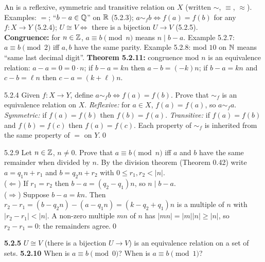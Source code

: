 
\begin{key}
An  is a reflexive, symmetric and transitive relation on $X$ (written $\sim$, $\equiv$, $\approx$). Examples: $=$; ``$b-a\in\mathbb{Q}$'' on $\mathbb{R}$ (5.2.3); $a\sim_fb\Leftrightarrow f(a)=f(b)$ for any $f:X\to Y$ (5.2.4); $U\cong V\Leftrightarrow$ there is a bijection $U\to V$ (5.2.5).\\
\textbf{Congruence:} for $n\in\mathbb{Z}$, $a\equiv b\pmod n$ means $n\mid b-a$. Example 5.2.7: $a\equiv b\pmod2$ iff $a,b$ have the same parity. Example 5.2.8: mod $10$ on $\mathbb{N}$ means ``same last decimal digit''. \textbf{Theorem 5.2.11:} congruence mod $n$ is an equivalence relation: $a-a=0=0\cdot n$; if $b-a=kn$ then $a-b=(-k)n$; if $b-a=kn$ and $c-b=\ell n$ then $c-a=(k+\ell)n$.
\end{key}

\begin{bookex}{5.2.4}
Given $f:X\to Y$, define $a\sim_fb\Leftrightarrow f(a)=f(b)$. Prove that $\sim_f$ is an equivalence relation on $X$.
\solution
\emph{Reflexive:} for $a\in X$, $f(a)=f(a)$, so $a\sim_fa$. \emph{Symmetric:} if $f(a)=f(b)$ then $f(b)=f(a)$. \emph{Transitive:} if $f(a)=f(b)$ and $f(b)=f(c)$ then $f(a)=f(c)$. Each property of $\sim_f$ is inherited from the same property of $=$ on $Y$.\qed
\end{bookex}

\begin{bookex}{5.2.9}
Let $n\in\mathbb{Z}$, $n\ne0$. Prove that $a\equiv b\pmod n$ iff $a$ and $b$ have the same remainder when divided by $n$.
\solution
By the division theorem (Theorem 0.42) write $a=q_1n+r_1$ and $b=q_2n+r_2$ with $0\le r_1,r_2<|n|$.\\
($\Leftarrow$) If $r_1=r_2$ then $b-a=(q_2-q_1)n$, so $n\mid b-a$.\\
($\Rightarrow$) Suppose $b-a=kn$. Then $r_2-r_1=(b-q_2n)-(a-q_1n)=(k-q_2+q_1)n$ is a multiple of $n$ with $|r_2-r_1|<|n|$. A non-zero multiple $mn$ of $n$ has $|mn|=|m||n|\ge|n|$, so $r_2-r_1=0$: the remainders agree.\qed
\end{bookex}

\begin{trybox}[{5.2.5, 5.2.10 \fO}]
\textbf{5.2.5} $U\cong V$ (there is a bijection $U\to V$) is an equivalence relation on a set of sets. \quad \textbf{5.2.10} When is $a\equiv b\pmod0$? When is $a\equiv b\pmod1$?
\end{trybox}

